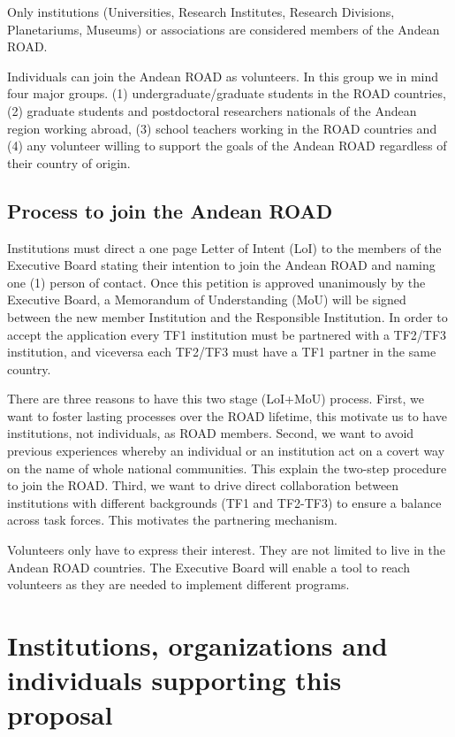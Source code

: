 \documentclass[12pt]{article}
\begin{document}
Only institutions (Universities, Research Institutes, Research
Divisions, Planetariums, Museums) or associations are considered
members of the Andean ROAD. 

Individuals can join the Andean ROAD as volunteers. In this group we
in mind four major groups. (1) undergraduate/graduate students in the
ROAD countries, (2) graduate students and postdoctoral researchers
nationals of the Andean region working abroad, (3) school teachers
working in the ROAD countries and (4) any volunteer willing to support
the goals of the Andean ROAD regardless of their country of origin. 


\subsection*{Process to join the Andean ROAD}

Institutions must direct a one page Letter of Intent (LoI) to the
members of the Executive Board stating their intention to join the
Andean ROAD and naming one (1) person of contact. Once this petition
is approved unanimously by the Executive Board, a Memorandum of
Understanding (MoU) will be signed between the new member Institution
and the Responsible Institution. In order to accept the application
every TF1 institution must be partnered with a TF2/TF3 institution,
and viceversa each TF2/TF3 must have a TF1 partner in the same
country. 

There are three reasons to have this two stage (LoI+MoU)
process. First, we want to foster lasting processes over the ROAD
lifetime, this motivate us to have institutions, not individuals, as
ROAD members. Second, we want to avoid previous experiences whereby an
individual or an institution act on a covert way on the name of whole
national communities. This explain the two-step procedure to join the
ROAD. Third, we want to drive direct collaboration between
institutions with different backgrounds (TF1 and TF2-TF3) to ensure a
balance across task forces. This motivates the partnering mechanism. 

Volunteers only have to express their interest. They are not limited
to live in the Andean ROAD countries. The Executive Board will enable
a tool to reach volunteers as they are needed to implement different
programs.  


\appendixpage
\appendix
\section{Institutions, organizations and individuals supporting this proposal}
\end{document}

